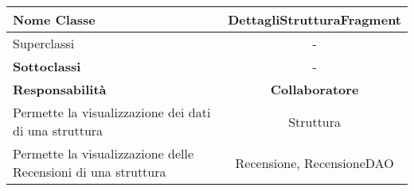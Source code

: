 
\setcounter{table}{0}
\begin{table}[H]
    \centering
    \begin{tabularx}{\textwidth}{||   X  ||  c   ||}
        \hline
        \rowcolor{Gray}
        \textbf{Nome Classe} & DettagliStrutturaFragment\\
        \hline
        Superclassi  &  - \\
        \hline
        \textbf{Sottoclassi} & - \\
        \hline
        \hline
         \textbf{Responsabilità} & \textbf{Collaboratore} \\
         \hline
          Permette la visualizzazione dei dati di una struttura & Struttura \\
         \hline
          Permette la visualizzazione delle Recensioni di una struttura & Recensione, RecensioneDAO \\
         \hline
    \end{tabularx}
\end{table}
